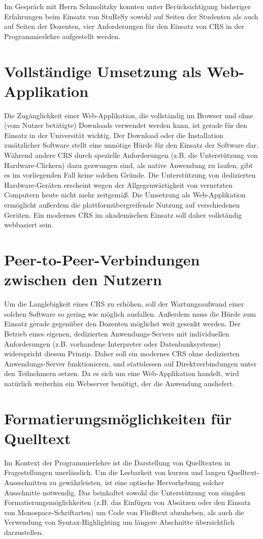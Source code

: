 Im Gespräch mit Herrn Schmolitzky konnten unter Berücksichtigung bisheriger Erfahrungen beim Einsatz von StuReSy sowohl auf Seiten der Studenten als auch auf Seiten der Dozenten, vier Anforderungen für den Einsatz von CRS in der Programmierlehre aufgestellt werden.

\section{Vollständige Umsetzung als Web-Applikation}
\label{chap:webbasiert}
Die Zugänglichkeit einer Web-Applikation, die vollständig im Browser und ohne (vom Nutzer betätigte) Downloads verwendet werden kann, ist gerade für den Einsatz in der Universität wichtig. Der Download oder die Installation zusätzlicher Software stellt eine unnötige Hürde für den Einsatz der Software dar. Während andere CRS durch spezielle Anforderungen (z.B. die Unterstützung von Hardware-Clickern) dazu gezwungen sind, als native Anwendung zu laufen, gibt es im vorliegenden Fall keine solchen Gründe. Die Unterstützung von dedizierten Hardware-Geräten erscheint wegen der Allgegenwärtigkeit von vernetzten Computern heute nicht mehr zeitgemäß. Die Umsetzung als Web-Applikation ermöglicht außerdem die plattformübergreifende Nutzung auf verschiedenen Geräten. Ein modernes CRS im akademischen Einsatz soll daher vollständig webbasiert sein.

\section{Peer-to-Peer-Verbindungen zwischen den Nutzern}
\label{chap:anforderung_p2p}
Um die Langlebigkeit eines CRS zu erhöhen, soll der Wartungsaufwand einer solchen Software so gering wie möglich ausfallen. Außerdem muss die Hürde zum Einsatz gerade gegenüber den Dozenten möglichst weit gesenkt werden. Der Betrieb eines eigenen, dedizierten Anwendungs-Servers mit individuellen Anforderungen (z.B. vorhandene Interpreter oder Datenbanksysteme) widerspricht diesem Prinzip. Daher soll ein modernes CRS ohne dedizierten Anwendungs-Server funktionieren, und stattdessen auf Direktverbindungen unter den Teilnehmern setzen. Da es sich um eine Web-Applikation handelt, wird natürlich weiterhin ein Webserver benötigt, der die Anwendung ausliefert.

\section{Formatierungsmöglichkeiten für Quelltext}
\label{chap:codeformatierung}
Im Kontext der Programmierlehre ist die Darstellung von Quelltexten in Fragestellungen unerlässlich. Um die Lesbarkeit von kurzen und langen Quelltext-Aussschnitten zu gewährleisten, ist eine optische Hervorhebung solcher Ausschnitte notwendig. Das beinhaltet sowohl die Unterstützung von simplen Formatierungsmöglichkeiten (z.B. das Einfügen von Absätzen oder den Einsatz von Monospace-Schriftarten) um Code von Fließtext abzuheben, als auch die Verwendung von Syntax-Highlighting um längere Abschnitte übersichtlich darzustellen. 

